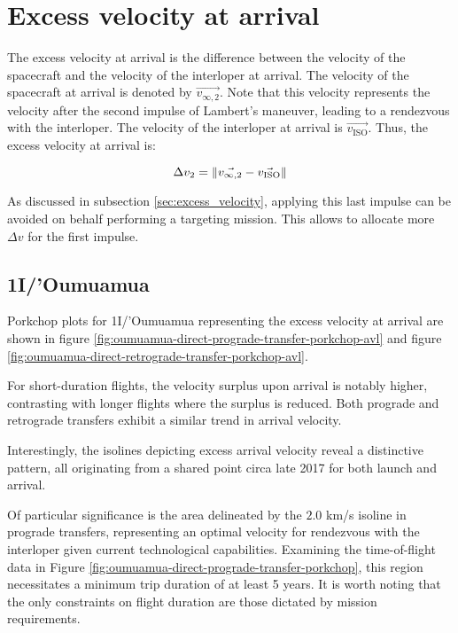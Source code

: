 \section{Excess velocity at arrival}

The excess velocity at arrival is the difference between the velocity of the
spacecraft and the velocity of the interloper at arrival. The
velocity of the spacecraft at arrival is denoted by $\vec{v_{\infty ,2}}$. Note
that this velocity represents the velocity after the second impulse of Lambert's
maneuver, leading to a rendezvous with the interloper. The velocity of the
interloper at arrival is $\vec{v_\text{ISO}}$. Thus, the excess velocity at
arrival is:

\begin{equation}
  \Delta v_2 = \lVert\vec{v_{\infty ,2}} - \vec{v_\text{ISO}}\rVert
\end{equation}

As discussed in subsection \ref{sec:excess_velocity}, applying this last impulse
can be avoided on behalf performing a targeting mission. This allows to allocate
more $\Delta v$ for the first impulse.

\subsection{1I/'Oumuamua}

Porkchop plots for 1I/'Oumuamua representing the excess velocity at arrival are
shown in figure \ref{fig:oumuamua-direct-prograde-transfer-porkchop-avl} and figure
\ref{fig:oumuamua-direct-retrograde-transfer-porkchop-avl}.

For short-duration flights, the velocity surplus upon arrival is notably higher,
contrasting with longer flights where the surplus is reduced. Both prograde and
retrograde transfers exhibit a similar trend in arrival velocity.

Interestingly, the isolines depicting excess arrival velocity reveal a
distinctive pattern, all originating from a shared point circa late 2017 for
both launch and arrival.

Of particular significance is the area delineated by the $2.0$ km/s isoline in
prograde transfers, representing an optimal velocity for rendezvous with the
interloper given current technological capabilities. Examining the
time-of-flight data in Figure
\ref{fig:oumuamua-direct-prograde-transfer-porkchop}, this region necessitates a
minimum trip duration of at least 5 years. It is worth noting that the only
constraints on flight duration are those dictated by mission requirements.

